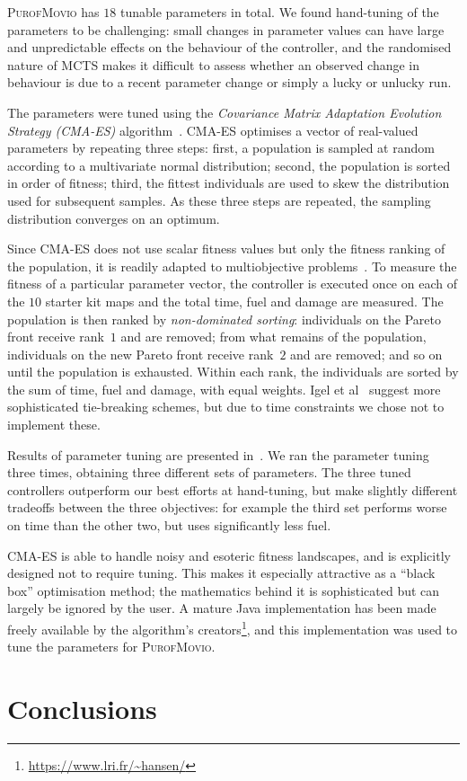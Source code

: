 \documentclass[conference]{IEEEtran}
\begin{document}
\textsc{PurofMovio} has $18$ tunable parameters in total.
We found hand-tuning of the parameters to be challenging:
small changes in parameter values can have large and unpredictable effects on the behaviour of the controller,
and the randomised nature of MCTS makes it difficult to assess whether an observed change in behaviour is due to a recent parameter change
or simply a lucky or unlucky run.

The parameters were tuned using the \emph{Covariance Matrix Adaptation Evolution Strategy (CMA-ES)} algorithm~\cite{Hansen2001}.
CMA-ES optimises a vector of real-valued parameters by repeating three steps:
first, a population is sampled at random according to a multivariate normal distribution;
second, the population is sorted in order of fitness;
third, the fittest individuals are used to skew the distribution used for subsequent samples.
As these three steps are repeated, the sampling distribution converges on an optimum.

Since CMA-ES does not use scalar fitness values but only the fitness ranking of the population,
it is readily adapted to multiobjective problems~\cite{Igel2007}.
To measure the fitness of a particular parameter vector,
the controller is executed once on each of the $10$ starter kit maps and the total time, fuel and damage are measured.
The population is then ranked by \emph{non-dominated sorting}:
individuals on the Pareto front receive rank~$1$ and are removed;
from what remains of the population, individuals on the new Pareto front receive rank~$2$ and are removed;
and so on until the population is exhausted.
Within each rank, the individuals are sorted by the sum of time, fuel and damage, with equal weights.
Igel et al~\cite{Igel2007} suggest more sophisticated tie-breaking schemes, but due to time constraints we chose not to implement these.

Results of parameter tuning are presented in~\cite{Powley2013_moptsp}.
We ran the parameter tuning three times, obtaining three different sets of parameters.
The three tuned controllers outperform our best efforts at hand-tuning,
but make slightly different tradeoffs between the three objectives:
for example the third set performs worse on time than the other two, but uses significantly less fuel.

CMA-ES is able to handle noisy and esoteric fitness landscapes, and is explicitly designed not to require tuning.
This makes it especially attractive as a ``black box'' optimisation method;
the mathematics behind it is sophisticated but can largely be ignored by the user.
A mature Java implementation has been made freely available by the algorithm's creators\footnote{\url{https://www.lri.fr/~hansen/}},
and this implementation was used to tune the parameters for \textsc{PurofMovio}.

\section{Conclusions} \label{sec:conc}




\end{document}
